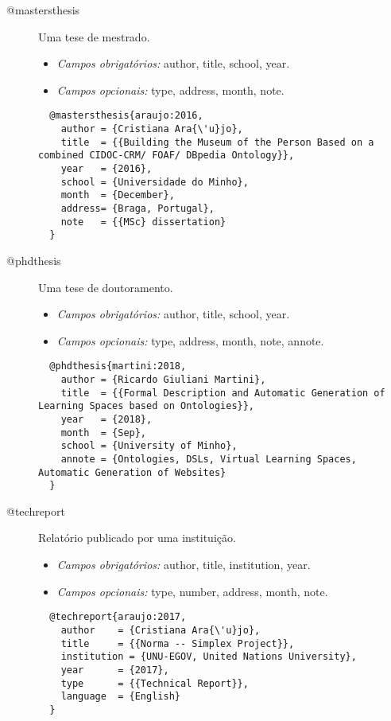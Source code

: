\documentclass{article}%
\begin{document}
\begin{description}
  \item[@mastersthesis] Uma tese de mestrado.
  \begin{itemize}
    \item \emph{Campos obrigatórios:} author, title, school, year.
    \item \emph{Campos opcionais:} type, address, month, note.
  \end{itemize}

  \begin{lstlisting}
  @mastersthesis{araujo:2016,
	author = {Cristiana Ara{\'u}jo},
	title  = {{Building the Museum of the Person Based on a combined CIDOC-CRM/ FOAF/ DBpedia Ontology}},
	year   = {2016},
    school = {Universidade do Minho},
    month  = {December},
    address= {Braga, Portugal},
    note   = {{MSc} dissertation}
  }
  \end{lstlisting}


  \item[@phdthesis]  Uma tese de doutoramento.
  \begin{itemize}
    \item \emph{Campos obrigatórios:} author, title, school, year.
    \item \emph{Campos opcionais:} type, address, month, note, annote.
  \end{itemize}

  \begin{lstlisting}
  @phdthesis{martini:2018,
    author = {Ricardo Giuliani Martini},
    title  = {{Formal Description and Automatic Generation of Learning Spaces based on Ontologies}},
    year   = {2018},
    month  = {Sep},
    school = {University of Minho},
    annote = {Ontologies, DSLs, Virtual Learning Spaces, Automatic Generation of Websites}
  }
  \end{lstlisting}


  \item[@techreport]  Relatório publicado por uma instituição.
  \begin{itemize}
    \item \emph{Campos obrigatórios:} author, title, institution, year.
    \item \emph{Campos opcionais:} type, number, address, month, note.
  \end{itemize}

  \begin{lstlisting}
  @techreport{araujo:2017,
	author    = {Cristiana Ara{\'u}jo},
	title     = {{Norma -- Simplex Project}},
    institution = {UNU-EGOV, United Nations University},
    year      = {2017},
    type      = {{Technical Report}},
	language  = {English}
  }
  \end{lstlisting}



\end{description}
\end{document}
